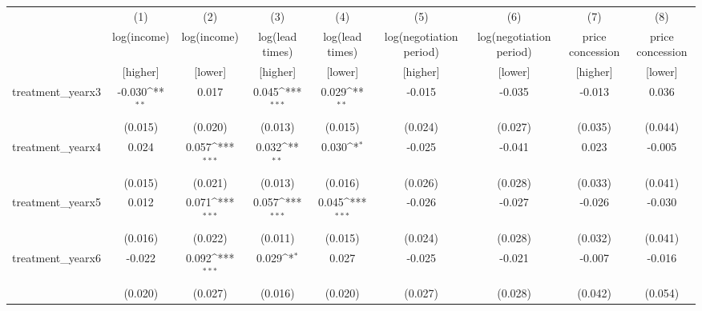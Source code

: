 {
\def\sym#1{\ifmmode^{#1}\else\(^{#1}\)\fi}
\begin{adjustbox}{max width=\textwidth}
\begin{tabular}{l*{8}{c}}
\toprule
            &\multicolumn{1}{c}{(1)}&\multicolumn{1}{c}{(2)}&\multicolumn{1}{c}{(3)}&\multicolumn{1}{c}{(4)}&\multicolumn{1}{c}{(5)}&\multicolumn{1}{c}{(6)}&\multicolumn{1}{c}{(7)}&\multicolumn{1}{c}{(8)}\\
            &\multicolumn{1}{c}{log(income)}&\multicolumn{1}{c}{log(income)}&\multicolumn{1}{c}{log(lead times)}&\multicolumn{1}{c}{log(lead times)}&\multicolumn{1}{c}{log(negotiation period)}&\multicolumn{1}{c}{log(negotiation period)}&\multicolumn{1}{c}{price concession}&\multicolumn{1}{c}{price concession}\\
&[higher]&[lower]&[higher]&[lower]&[higher]&[lower]&[higher]&[lower]\\
\midrule
treatment\_yearx3&      -0.030\sym{**} &       0.017         &       0.045\sym{***}&       0.029\sym{**} &      -0.015         &      -0.035         &      -0.013         &       0.036         \\
            &     (0.015)         &     (0.020)         &     (0.013)         &     (0.015)         &     (0.024)         &     (0.027)         &     (0.035)         &     (0.044)         \\
\addlinespace
treatment\_yearx4&       0.024         &       0.057\sym{***}&       0.032\sym{**} &       0.030\sym{*}  &      -0.025         &      -0.041         &       0.023         &      -0.005         \\
            &     (0.015)         &     (0.021)         &     (0.013)         &     (0.016)         &     (0.026)         &     (0.028)         &     (0.033)         &     (0.041)         \\
\addlinespace
treatment\_yearx5&       0.012         &       0.071\sym{***}&       0.057\sym{***}&       0.045\sym{***}&      -0.026         &      -0.027         &      -0.026         &      -0.030         \\
            &     (0.016)         &     (0.022)         &     (0.011)         &     (0.015)         &     (0.024)         &     (0.028)         &     (0.032)         &     (0.041)         \\
\addlinespace
treatment\_yearx6&      -0.022         &       0.092\sym{***}&       0.029\sym{*}  &       0.027         &      -0.025         &      -0.021         &      -0.007         &      -0.016         \\
            &     (0.020)         &     (0.027)         &     (0.016)         &     (0.020)         &     (0.027)         &     (0.028)         &     (0.042)         &     (0.054)         \\

\end{tabular}
\end{adjustbox}}
